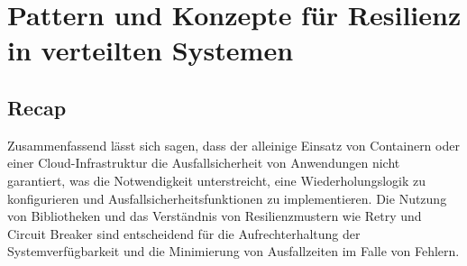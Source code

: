\section{Pattern und Konzepte für Resilienz in verteilten Systemen}








\subsection{Recap}

Zusammenfassend lässt sich sagen, dass der alleinige Einsatz von Containern
oder einer Cloud-Infrastruktur die Ausfallsicherheit von Anwendungen nicht garantiert,
was die Notwendigkeit unterstreicht, eine Wiederholungslogik zu konfigurieren und Ausfallsicherheitsfunktionen zu implementieren.
Die Nutzung von Bibliotheken und das Verständnis von Resilienzmustern wie Retry und Circuit Breaker
sind entscheidend für die Aufrechterhaltung der Systemverfügbarkeit und die Minimierung von Ausfallzeiten im Falle von Fehlern.
